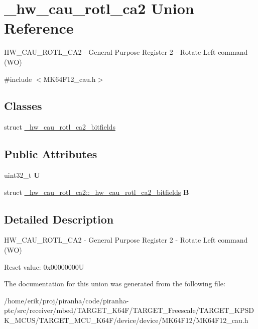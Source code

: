 \hypertarget{union__hw__cau__rotl__ca2}{}\section{\+\_\+hw\+\_\+cau\+\_\+rotl\+\_\+ca2 Union Reference}
\label{union__hw__cau__rotl__ca2}


H\+W\+\_\+\+C\+A\+U\+\_\+\+R\+O\+T\+L\+\_\+\+C\+A2 -\/ General Purpose Register 2 -\/ Rotate Left command (WO)  




{\ttfamily \#include $<$M\+K64\+F12\+\_\+cau.\+h$>$}

\subsection*{Classes}
\begin{DoxyCompactItemize}
\item 
struct \hyperlink{struct__hw__cau__rotl__ca2_1_1__hw__cau__rotl__ca2__bitfields}{\+\_\+hw\+\_\+cau\+\_\+rotl\+\_\+ca2\+\_\+bitfields}
\end{DoxyCompactItemize}
\subsection*{Public Attributes}
\begin{DoxyCompactItemize}
\item 
uint32\+\_\+t {\bfseries U}\hypertarget{union__hw__cau__rotl__ca2_a5bebdbb805e128a0a91b225b00aecb5b}{}\label{union__hw__cau__rotl__ca2_a5bebdbb805e128a0a91b225b00aecb5b}

\item 
struct \hyperlink{struct__hw__cau__rotl__ca2_1_1__hw__cau__rotl__ca2__bitfields}{\+\_\+hw\+\_\+cau\+\_\+rotl\+\_\+ca2\+::\+\_\+hw\+\_\+cau\+\_\+rotl\+\_\+ca2\+\_\+bitfields} {\bfseries B}\hypertarget{union__hw__cau__rotl__ca2_aa2826530d571a12d53e3f29aac366023}{}\label{union__hw__cau__rotl__ca2_aa2826530d571a12d53e3f29aac366023}

\end{DoxyCompactItemize}


\subsection{Detailed Description}
H\+W\+\_\+\+C\+A\+U\+\_\+\+R\+O\+T\+L\+\_\+\+C\+A2 -\/ General Purpose Register 2 -\/ Rotate Left command (WO) 

Reset value\+: 0x00000000U 

The documentation for this union was generated from the following file\+:\begin{DoxyCompactItemize}
\item 
/home/erik/proj/piranha/code/piranha-\/ptc/src/receiver/mbed/\+T\+A\+R\+G\+E\+T\+\_\+\+K64\+F/\+T\+A\+R\+G\+E\+T\+\_\+\+Freescale/\+T\+A\+R\+G\+E\+T\+\_\+\+K\+P\+S\+D\+K\+\_\+\+M\+C\+U\+S/\+T\+A\+R\+G\+E\+T\+\_\+\+M\+C\+U\+\_\+\+K64\+F/device/device/\+M\+K64\+F12/M\+K64\+F12\+\_\+cau.\+h\end{DoxyCompactItemize}
